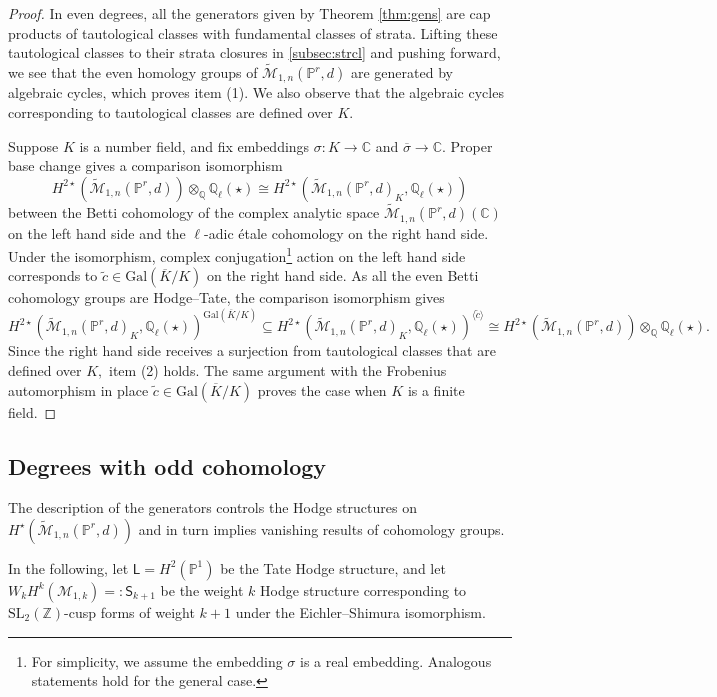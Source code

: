 \documentclass[12pt,reqno]{amsart}
\theoremstyle{definition}
\theoremstyle{definition}
\theoremstyle{definition}
\theoremstyle{definition}
\newcommand{\PP}{\mathbb{P}}
\newcommand{\Mtil}{\widetilde{\mathcal{M}}}
\begin{document}
\begin{proof}
  In even degrees, all the generators given by Theorem \ref{thm:gens} are cap products of tautological classes with fundamental classes of strata. Lifting these tautological classes to their strata closures in \ref{subsec:strcl} and pushing forward, we see that the even homology groups of $\Mtil_{1,n}(\PP^r,d)$ are generated by algebraic cycles, which proves item (1). We also observe that the algebraic cycles corresponding to tautological classes are defined over $K.$
   
  Suppose $K$ is a number field, and fix embeddings $\sigma: K\to \mathbb{C}$ and $\overline{\sigma}\to \mathbb{C}.$ Proper base change \cite[Exp. XII]{SGA43} gives a comparison isomorphism $$H^{2\star}(\Mtil_{1,n}(\PP^r,d))\otimes_{\mathbb{Q}}\mathbb{Q}_\ell(\star)\cong H^{2\star}(\Mtil_{1,n}(\PP^r,d)_K, \mathbb{Q}_\ell(\star))$$ between the Betti cohomology of the complex analytic space $\Mtil_{1,n}(\PP^r,d)(\mathbb{C})$ on the left hand side and the $\ell$-adic étale cohomology on the right hand side. Under the isomorphism, complex conjugation\footnote{For simplicity, we assume the embedding $\sigma$ is a real embedding. Analogous statements hold for the general case.} action on the left hand side corresponds to $\tilde{c}\in \mathrm{Gal}(\overline{K}/K)$ on the right hand side. As all the even Betti cohomology groups are Hodge--Tate, the comparison isomorphism gives $$H^{2\star}(\Mtil_{1,n}(\PP^r,d)_K, \mathbb{Q}_\ell(\star))^{\mathrm{Gal}(\overline{K}/K)}\subseteq H^{2\star}(\Mtil_{1,n}(\PP^r,d)_K, \mathbb{Q}_\ell(\star))^{\langle\tilde{c}\rangle}\cong H^{2\star}(\Mtil_{1,n}(\PP^r,d))\otimes_{\mathbb{Q}}\mathbb{Q}_\ell(\star).$$ Since the right hand side receives a surjection from tautological classes that are defined over $K,$ item (2) holds. The same argument with the Frobenius automorphism in place $\tilde{c}\in \mathrm{Gal}(\overline{K}/K)$ proves the case when $K$ is a finite field.
\end{proof}

\subsection{Degrees with odd cohomology}\label{sec:degodd}

The description of the generators controls the Hodge structures on $H^\star(\Mtil_{1,n}(\mathbb{P}^r,d))$ and in turn implies vanishing results of cohomology groups.

In the following, let $\mathsf{L} = H^2(\mathbb{P}^1)$ be the Tate Hodge structure, and let $W_k H^k(\mathcal{M}_{1,k})=: \mathsf{S}_{k+1}$ be the weight $k$ Hodge structure corresponding to $\mathrm{SL}_{2}(\mathbb{Z})$-cusp forms of weight $k+1$ under the Eichler--Shimura isomorphism.
\end{document}
